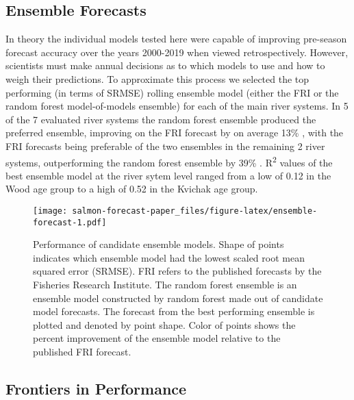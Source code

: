 \documentclass[
]{article}
\begin{document}
\hypertarget{ensemble-forecasts}{%
\subsection*{Ensemble Forecasts}\label{ensemble-forecasts}}

In theory the individual models tested here were capable of improving pre-season forecast accuracy over the years 2000-2019 when viewed retrospectively. However, scientists must make annual decisions as to which models to use and how to weigh their predictions. To approximate this process we selected the top performing (in terms of SRMSE) rolling ensemble model (either the FRI or the random forest model-of-models ensemble) for each of the main river systems. In 5 of the 7 evaluated river systems the random forest ensemble produced the preferred ensemble, improving on the FRI forecast by on average 13\% , with the FRI forecasts being preferable of the two ensembles in the remaining 2 river systems, outperforming the random forest ensemble by 39\% . R\textsuperscript{2} values of the best ensemble model at the river sytem level ranged from a low of 0.12 in the Wood age group to a high of 0.52 in the Kvichak age group.

\begin{figure}
\centering
\texttt{[image: salmon-forecast-paper\_files/figure-latex/ensemble-forecast-1.pdf]}
\caption{\label{fig:ensemble-forecast}Performance of candidate ensemble models. Shape of points indicates which ensemble model had the lowest scaled root mean squared error (SRMSE). FRI refers to the published forecasts by the Fisheries Research Institute. The random forest ensemble is an ensemble model constructed by random forest made out of candidate model forecasts. The forecast from the best performing ensemble is plotted and denoted by point shape. Color of points shows the percent improvement of the ensemble model relative to the published FRI forecast.}
\end{figure}

\hypertarget{frontiers-in-performance}{%
\subsection*{Frontiers in Performance}\label{frontiers-in-performance}}
\end{document}
